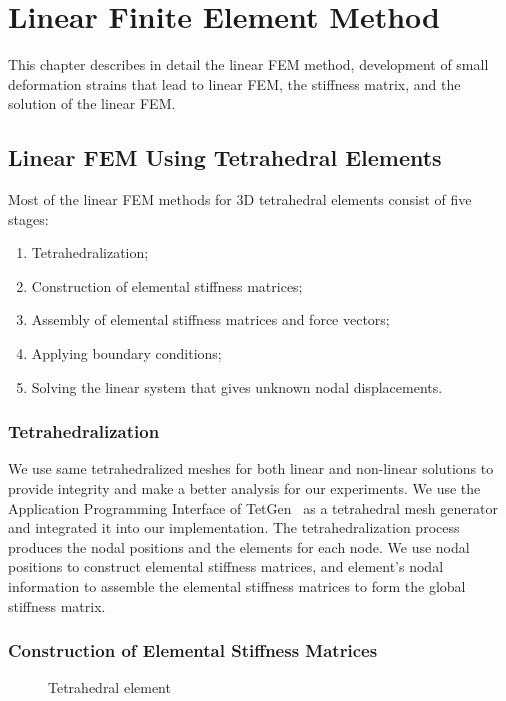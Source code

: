 \chapter{Linear Finite Element Method}
\label{chapter4}

This chapter describes in detail the linear FEM method, development of small deformation strains that lead to linear FEM, the stiffness matrix, and the solution of the linear FEM.

\section{Linear FEM Using Tetrahedral Elements}
\label{sec3LinFEM}

Most of the linear FEM methods for 3D tetrahedral elements consist of five stages:

\begin{enumerate}
\item Tetrahedralization;
\item Construction of elemental stiffness matrices;
\item Assembly of elemental stiffness matrices and force vectors;
\item Applying boundary conditions;
\item Solving the linear system that gives unknown nodal displacements.
\end{enumerate}


\subsection{Tetrahedralization}

We use same tetrahedralized meshes for both linear and non-linear solutions to provide integrity and make a better analysis for our experiments. We use the Application Programming Interface of TetGen~\cite{Tetgen2011} as a tetrahedral mesh generator and integrated it into our implementation. The tetrahedralization process produces the nodal positions and the elements for each node. We use nodal positions to construct elemental stiffness matrices, and element's nodal information to assemble the elemental stiffness matrices to form the global stiffness matrix.

\subsection{Construction of Elemental Stiffness Matrices}

\begin{figure}[h]
\centerline{}
\caption{Tetrahedral element}
\label{fig:tetelement}
\end{figure}

